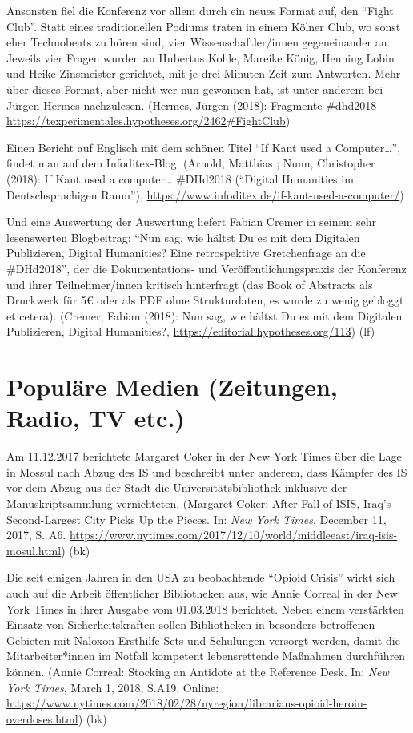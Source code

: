 \documentclass[a4paper,
fontsize=11pt,
oneside,
numbers=noperiodatend,
parskip=half-,
bibliography=totoc,
final
]{scrartcl}
\begin{document}
Ansonsten fiel die Konferenz vor allem durch ein neues Format auf, den
\enquote{Fight Club}. Statt eines traditionellen Podiums traten in einem
Kölner Club, wo sonst eher Technobeats zu hören sind, vier
Wissenschaftler/innen gegeneinander an. Jeweils vier Fragen wurden an
Hubertus Kohle, Mareike König, Henning Lobin und Heike Zinsmeister
gerichtet, mit je drei Minuten Zeit zum Antworten. Mehr über dieses
Format, aber nicht wer nun gewonnen hat, ist unter anderem bei Jürgen
Hermes nachzulesen. (Hermes, Jürgen (2018): Fragmente \#dhd2018
\url{https://texperimentales.hypotheses.org/2462\#FightClub})

Einen Bericht auf Englisch mit dem schönen Titel \enquote{If Kant used a
Computer\ldots{}}, findet man auf dem Infoditex-Blog. (Arnold, Matthias
; Nunn, Christopher (2018): If Kant used a computer\ldots{} \#DHd2018
(\enquote{Digital Humanities im Deutschsprachigen Raum}),
\url{https://www.infoditex.de/if-kant-used-a-computer/})

Und eine Auswertung der Auswertung liefert Fabian Cremer in seinem sehr
lesenswerten Blogbeitrag: \enquote{Nun sag, wie hältst Du es mit dem
Digitalen Publizieren, Digital Humanities? Eine retrospektive
Gretchenfrage an die \#DHd2018}, der die Dokumentations- und
Veröffentlichungspraxis der Konferenz und ihrer Teilnehmer/innen
kritisch hinterfragt (das Book of Abstracts als Druckwerk für 5€ oder
als PDF ohne Strukturdaten, es wurde zu wenig gebloggt et cetera).
(Cremer, Fabian (2018): Nun sag, wie hältst Du es mit dem Digitalen
Publizieren, Digital Humanities?,
\url{https://editorial.hypotheses.org/113}) (lf)

\hypertarget{populuxe4re-medien-zeitungen-radio-tv-etc.}{%
\section{Populäre Medien (Zeitungen, Radio, TV
etc.)}\label{populuxe4re-medien-zeitungen-radio-tv-etc.}}

Am 11.12.2017 berichtete Margaret Coker in der New York Times über die
Lage in Mossul nach Abzug des IS und beschreibt unter anderem, dass
Kämpfer des IS vor dem Abzug aus der Stadt die Universitätsbibliothek
inklusive der Manuskriptsammlung vernichteten. (Margaret Coker: After
Fall of ISIS, Iraq's Second-Largest City Picks Up the Pieces. In:
\emph{New York Times}, December 11, 2017, S. A6.
\url{https://www.nytimes.com/2017/12/10/world/middleeast/iraq-isis-mosul.html})
(bk)

Die seit einigen Jahren in den USA zu beobachtende \enquote{Opioid
Crisis} wirkt sich auch auf die Arbeit öffentlicher Bibliotheken aus,
wie Annie Correal in der New York Times in ihrer Ausgabe vom 01.03.2018
berichtet. Neben einem verstärkten Einsatz von Sicherheitskräften sollen
Bibliotheken in besonders betroffenen Gebieten mit
Naloxon-Ersthilfe-Sets und Schulungen versorgt werden, damit die
Mitarbeiter*innen im Notfall kompetent lebensrettende Maßnahmen
durchführen können. (Annie Correal: Stocking an Antidote at the
Reference Desk. In: \emph{New York Times}, March 1, 2018, S.A19. Online:
\url{https://www.nytimes.com/2018/02/28/nyregion/librarians-opioid-heroin-overdoses.html})
(bk)
\end{document}
